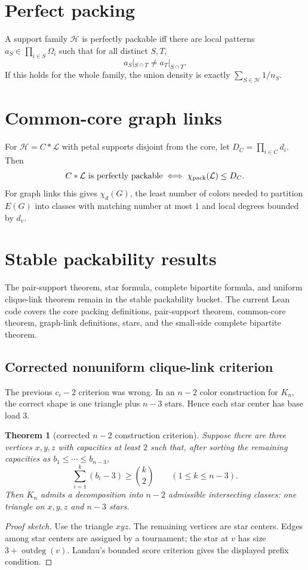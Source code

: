 \documentclass[11pt]{article}
\newtheorem{theorem}{Theorem}
\begin{document}
\section{Perfect packing}
A support family $\mathcal H$ is perfectly packable iff there are local patterns $a_S\in\prod_{i\in S}\Omega_i$ such that for all distinct $S,T$,
\[
a_S|_{S\cap T}\ne a_T|_{S\cap T}.
\]
If this holds for the whole family, the union density is exactly $\sum_{S\in\mathcal H}1/n_S$.

\section{Common-core graph links}
For $\mathcal H=C*\mathcal L$ with petal supports disjoint from the core, let $D_C=\prod_{i\in C}d_i$. Then
\[
C*\mathcal L\text{ is perfectly packable}\iff \chi_{\rm pack}(\mathcal L)\le D_C.
\]
For graph links this gives $\chi_d(G)$, the least number of colors needed to partition $E(G)$ into classes with matching number at most $1$ and local degrees bounded by $d_v$.

\section{Stable packability results}
The pair-support theorem, star formula, complete bipartite formula, and uniform clique-link theorem remain in the stable packability bucket. The current Lean code covers the core packing definitions, pair-support theorem, common-core theorem, graph-link definitions, stars, and the small-side complete bipartite theorem.

\subsection{Corrected nonuniform clique-link criterion}
The previous $c_i-2$ criterion was wrong. In an $n-2$ color construction for $K_n$, the correct shape is one triangle plus $n-3$ stars. Hence each star center has base load $3$.

\begin{theorem}[corrected $n-2$ construction criterion]
Suppose there are three vertices $x,y,z$ with capacities at least $2$ such that, after sorting the remaining capacities as $b_1\le\cdots\le b_{n-3}$,
\[
\sum_{i=1}^k(b_i-3)\ge {k\choose2}\qquad(1\le k\le n-3).
\]
Then $K_n$ admits a decomposition into $n-2$ admissible intersecting classes: one triangle on $x,y,z$ and $n-3$ stars.
\end{theorem}
\begin{proof}[Proof sketch]
Use the triangle $xyz$. The remaining vertices are star centers. Edges among star centers are assigned by a tournament; the star at $v$ has size $3+\operatorname{outdeg}(v)$. Landau's bounded score criterion gives the displayed prefix condition.
\end{proof}
\end{document}
